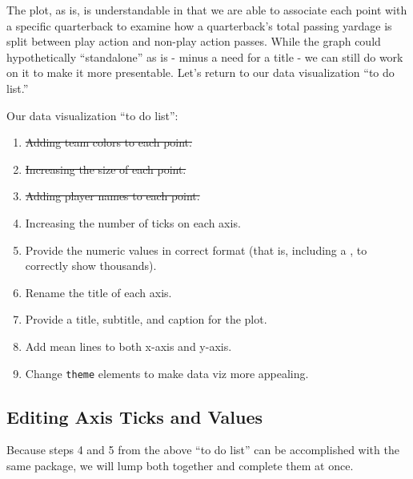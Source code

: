 \documentclass[
  letterpaper,
]{krantz}
\begin{document}
The plot, as is, is understandable in that we are able to associate each
point with a specific quarterback to examine how a quarterback's total
passing yardage is split between play action and non-play action passes.
While the graph could hypothetically ``standalone'' as is - minus a need
for a title - we can still do work on it to make it more presentable.
Let's return to our data visualization ``to do list.''

\begin{tcolorbox}[enhanced jigsaw, colback=white, leftrule=.75mm, breakable, colframe=quarto-callout-note-color-frame, bottomtitle=1mm, rightrule=.15mm, left=2mm, opacityback=0, bottomrule=.15mm, arc=.35mm, coltitle=black, colbacktitle=quarto-callout-note-color!10!white, toptitle=1mm, titlerule=0mm, title=\textcolor{quarto-callout-note-color}{\faInfo}\hspace{0.5em}{Note}, toprule=.15mm, opacitybacktitle=0.6]

Our data visualization ``to do list'':

\begin{enumerate}
\def\labelenumi{\arabic{enumi}.}
\item
  \st{Adding team colors to each point.}
\item
  \st{Increasing the size of each point.}
\item
  \st{Adding player names to each point.}
\item
  Increasing the number of ticks on each axis.
\item
  Provide the numeric values in correct format (that is, including a ,
  to correctly show thousands).
\item
  Rename the title of each axis.
\item
  Provide a title, subtitle, and caption for the plot.
\item
  Add mean lines to both x-axis and y-axis.
\item
  Change \texttt{theme} elements to make data viz more appealing.
\end{enumerate}

\end{tcolorbox}

\hypertarget{editing-axis-ticks-and-values}{%
\subsection{Editing Axis Ticks and
Values}\label{editing-axis-ticks-and-values}}

Because steps 4 and 5 from the above ``to do list'' can be accomplished
with the same package, we will lump both together and complete them at
once.
\end{document}

